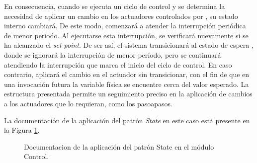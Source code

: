 \begin{figure}[H]
\begin{center}
\end{center}
\end{figure}


En consecuencia, cuando se ejecuta un ciclo de control y se determina la necesidad de aplicar un cambio en los actuadores controlados por \ControlSeguimiento, su estado interno cambiará. De este modo, comenzará a atender la interrupción periódica de menor periodo. Al ejecutarse esta interrupción, se verificará nuevamente si se ha alcanzado el \textit{set-point}. De ser así, el sistema transicionará al estado de espera \Waiting, donde se ignorará la interrupción de menor período, pero se continuará atendiendo la interrupción que marca el inicio del ciclo de control. En caso contrario, aplicará el cambio en el actuador sin transicionar, con el fin de que en una invocación futura la variable física se encuentre cerca del valor esperado. La estructura presentada permite un seguimiento preciso en la aplicación de cambios a los actuadores que lo requieran, como los \glspl{pasoapaso}.

La documentación de la aplicación del patrón \textit{State} en este caso está presente en la Figura \ref{docStateControl}.

\begin{figure}
\caption{Documentacion de la aplicación del patrón State en el módulo Control.}
\label{docStateControl}
\end{figure}


